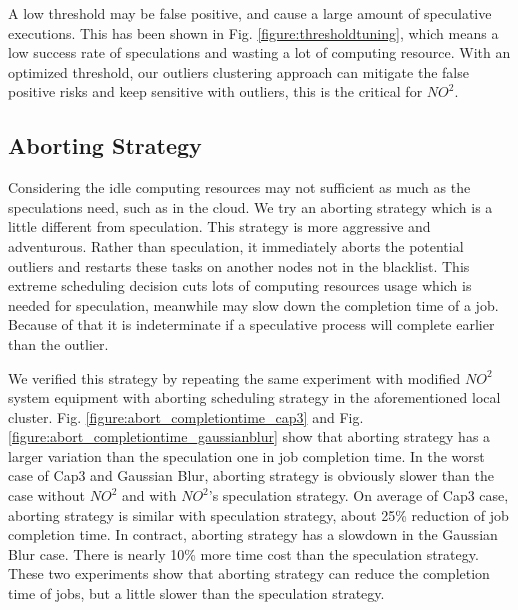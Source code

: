 A low threshold may be false positive, and cause a large amount of speculative executions. This has been shown in Fig.  \ref{figure:thresholdtuning}, which means a low success rate of speculations and wasting a lot of computing resource. With an optimized threshold, our outliers clustering approach can mitigate the false positive risks and keep sensitive with outliers, this is the critical for $NO^2$.

\subsection{Aborting Strategy}

Considering the idle computing resources may not sufficient as much as the speculations need, such as in the cloud. We try an aborting strategy which is a little different from speculation. This strategy is more aggressive and adventurous. Rather than speculation, it immediately aborts the potential outliers and restarts these tasks on another nodes not in the blacklist. This extreme scheduling decision cuts lots of computing resources usage which is needed for speculation, meanwhile may slow down the completion time of a job. Because of that it is indeterminate if a speculative process will complete earlier than the outlier.

We verified this strategy by repeating the same experiment with modified $NO^2$ system equipment with aborting scheduling strategy in the aforementioned local cluster. Fig. \ref{figure:abort_completiontime_cap3} and Fig. \ref{figure:abort_completiontime_gaussianblur} show that aborting strategy has a larger variation than the speculation one in job completion time. In the worst case of Cap3 and Gaussian Blur, aborting strategy is obviously slower than the case without $NO^2$ and with $NO^2$'s speculation strategy. On average of Cap3 case, aborting strategy is similar with speculation strategy, about 25\% reduction of job completion time. In contract, aborting strategy has a slowdown in the Gaussian Blur case. There is nearly 10\% more time cost than the speculation strategy. These two experiments show that aborting strategy can reduce the completion time of jobs, but a little slower than the speculation strategy.

